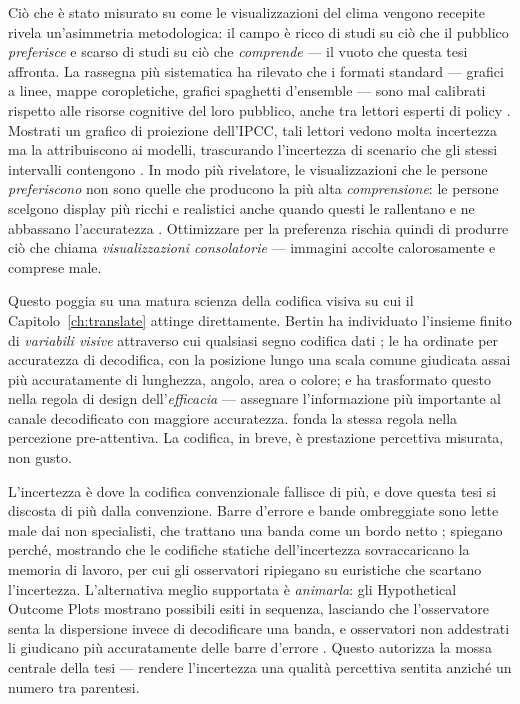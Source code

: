 Ciò che è stato misurato su come le visualizzazioni del clima vengono recepite rivela un'asimmetria metodologica: il campo è ricco di studi su ciò che il pubblico \emph{preferisce} e scarso di studi su ciò che \emph{comprende} --- il vuoto che questa tesi affronta. La rassegna più sistematica ha rilevato che i formati standard --- grafici a linee, mappe coropletiche, grafici spaghetti d'ensemble --- sono mal calibrati rispetto alle risorse cognitive del loro pubblico, anche tra lettori esperti di policy \citep{harold2016}. Mostrati un grafico di proiezione dell'IPCC, tali lettori vedono molta incertezza ma la attribuiscono ai modelli, trascurando l'incertezza di scenario che gli stessi intervalli contengono \parencite{mcmahon2015}. In modo più rivelatore, le visualizzazioni che le persone \emph{preferiscono} non sono quelle che producono la più alta \emph{comprensione}: le persone scelgono display più ricchi e realistici anche quando questi le rallentano e ne abbassano l'accuratezza \parencite{hegarty2012}. Ottimizzare per la preferenza rischia quindi di produrre ciò che \citet{sheppard2015} chiama \emph{visualizzazioni consolatorie} --- immagini accolte calorosamente e comprese male.

Questo poggia su una matura scienza della codifica visiva su cui il Capitolo~\ref{ch:translate} attinge direttamente. Bertin ha individuato l'insieme finito di \emph{variabili visive} attraverso cui qualsiasi segno codifica dati \citep{bertin1983}; \citet{clevelandmcgill1984} le ha ordinate per accuratezza di decodifica, con la posizione lungo una scala comune giudicata assai più accuratamente di lunghezza, angolo, area o colore; e \citet{munzner2014} ha trasformato questo nella regola di design dell'\emph{efficacia} --- assegnare l'informazione più importante al canale decodificato con maggiore accuratezza. \citet{ware2021} fonda la stessa regola nella percezione pre-attentiva. La codifica, in breve, è prestazione percettiva misurata, non gusto.



L'incertezza è dove la codifica convenzionale fallisce di più, e dove questa tesi si discosta di più dalla convenzione. Barre d'errore e bande ombreggiate sono lette male dai non specialisti, che trattano una banda come un bordo netto \citep{spiegelhalter2017}; \citet{padilla2018} spiegano perché, mostrando che le codifiche statiche dell'incertezza sovraccaricano la memoria di lavoro, per cui gli osservatori ripiegano su euristiche che scartano l'incertezza. L'alternativa meglio supportata è \emph{animarla}: gli Hypothetical Outcome Plots mostrano possibili esiti in sequenza, lasciando che l'osservatore senta la dispersione invece di decodificare una banda, e osservatori non addestrati li giudicano più accuratamente delle barre d'errore \citep{hullman2015hops, kale2019hops}. Questo autorizza la mossa centrale della tesi --- rendere l'incertezza una qualità percettiva sentita anziché un numero tra parentesi.

